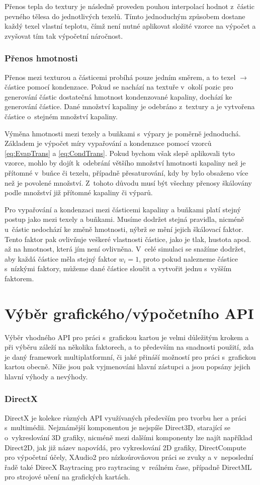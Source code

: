Přenos tepla do textury je následně proveden pouhou interpolací hodnot z~částic pevného tělesa do jednotlivých texelů. Tímto jednoduchým způsobem dostane každý texel vlastní teplotu, čímž není nutné aplikovat složité vzorce na výpočet a zvyšovat tím tak výpočetní náročnost.

\subsubsection{Přenos hmotnosti}
Přenos mezi texturou a částicemi probíhá pouze jedním směrem, a to texel $\rightarrow$ částice pomocí kondenzace. Pokud se nachází na textuře v~okolí pozic pro generování částic dostatečná hmotnost kondenzované kapaliny, dochází ke generování částice. Dané množství kapaliny je odebráno z~textury a je vytvořena částice o~stejném množství kapaliny.

Výměna hmotnosti mezi texely a buňkami s~výpary je poměrně jednoduchá. Základem je výpočet míry vypařování a kondenzace pomocí vzorců \ref{eq:EvapTrans} a \ref{eq:CondTrans}. Pokud bychom však slepě aplikovali tyto vzorce, mohlo by dojít k~odebrání většího množství hmotnosti kapaliny než je přítomné v~buňce či texelu, případně přesaturování, kdy by bylo obsaženo více než je povolené množství. Z~tohoto důvodu musí být všechny přenosy škálovány podle množství již přítomné kapaliny či výparů.

Pro vypařování a kondenzaci mezi částicemi kapaliny a buňkami platí stejný postup jako mezi texely a buňkami. Musíme dodržet stejná pravidla, nicméně u~částic nedochází ke změně hmotnosti, nýbrž se mění jejich škálovací faktor. Tento faktor pak ovlivňuje veškeré vlastnosti částice, jako je tlak, hustota apod. až na hmotnost, která jím není ovlivněna. V~celé simulaci se snažíme dodržet, aby každá částice měla stejný faktor $w_i = 1$, proto pokud nalezneme částice s~nízkými faktory, můžeme dané částice sloučit a vytvořit jednu s~vyšším faktorem.

\section{Výběr grafického/výpočetního API}
Výběr vhodného API pro práci s~grafickou kartou je velmi důležitým krokem a při výběru záleží na několika faktorech, a to především na snadnosti použití, zda je daný framework multiplatformní, či jaké přináší možností pro práci s~grafickou kartou obecně. Níže jsou pak vyjmenováni hlavní zástupci a jsou popsány jejich hlavní výhody a nevýhody.
\subsubsection{DirectX}
DirectX je kolekce různých API využívaných především pro tvorbu her a práci s~multimédii. Nejznámější komponentou je nejspíše Direct3D, starající se o~vykreslování 3D grafiky, nicméně mezi dalšími komponenty lze najít například Direct2D, jak již název napovídá, pro vykreslování 2D grafiky, DirectCompute pro výpočetní účely, XAudio2 pro nízkoúrovňovou práci se zvuky a v~neposlední řadě také DirecX Raytracing pro raytracing v~reálném čase, případně DirectML pro strojové učení na grafických kartách. \cite{pcmag}

